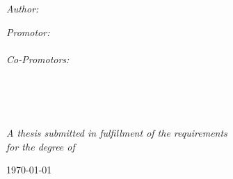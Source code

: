 \begin{titlepage}
    \begin{center}
    
    \vspace*{.06\textheight}
    {\scshape\LARGE \univname\par}\vspace{1.5cm} %
    
    {\huge \bfseries \ttitle\par}\vspace{0.4cm} %
    {\emph{\large \subjectname}}\vspace{2.4cm}
     
    \begin{minipage}[t]{0.4\textwidth}
    \begin{flushleft} \large
    \emph{Author:}\\
    \authorname %
    \end{flushleft}
    \end{minipage}
    \begin{minipage}[t]{0.4\textwidth}
    \begin{flushright} \large
    \emph{Promotor:} \\
    \promotor\vspace{0.2cm} \\
    \emph{Co-Promotors:} \\
    \firstco \\
    \secondco \\
    \end{flushright}
    \end{minipage}\\[3cm]
     
    \vfill
    
    \large \textit{A thesis submitted in fulfillment of the requirements\\ for the degree of \degreename}\\[0.3cm] %
     
    \vfill
    
    {\large \today}\\[4cm] %
     
    \vfill
    \end{center}
    \end{titlepage}